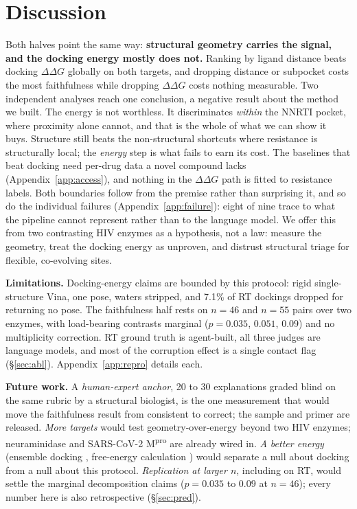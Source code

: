 \documentclass{article}
\newcommand{\ddg}{\ensuremath{\Delta\Delta G}}
\begin{document}
\section{Discussion}
Both halves point the same way: \textbf{structural geometry carries the signal, and the docking energy mostly does not.} Ranking by ligand distance beats docking \ddg{} globally on both targets, and dropping distance or subpocket costs the most faithfulness while dropping \ddg{} costs nothing measurable. Two independent analyses reach one conclusion, a negative result about the method we built. The energy is not worthless. It discriminates \emph{within} the NNRTI pocket, where proximity alone cannot, and that is the whole of what we can show it buys. Structure still beats the non-structural shortcuts where resistance is structurally local; the \emph{energy} step is what fails to earn its cost. The baselines that beat docking need per-drug data a novel compound lacks (Appendix~\ref{app:access}), and nothing in the \ddg{} path is fitted to resistance labels. Both boundaries follow from the premise rather than surprising it, and so do the individual failures (Appendix~\ref{app:failure}): eight of nine trace to what the pipeline cannot represent rather than to the language model. We offer this from two contrasting HIV enzymes as a hypothesis, not a law: measure the geometry, treat the docking energy as unproven, and distrust structural triage for flexible, co-evolving sites.

\textbf{Limitations.} Docking-energy claims are bounded by this protocol: rigid single-structure Vina, one pose, waters stripped, and 7.1\% of RT dockings dropped for returning no pose. The faithfulness half rests on $n=46$ and $n=55$ pairs over two enzymes, with load-bearing contrasts marginal ($p=0.035$, $0.051$, $0.09$) and no multiplicity correction. RT ground truth is agent-built, all three judges are language models, and most of the corruption effect is a single contact flag (\S\ref{sec:abl}). Appendix~\ref{app:repro} details each.

\textbf{Future work.} A \emph{human-expert anchor}, 20 to 30 explanations graded blind on the same rubric by a structural biologist, is the one measurement that would move the faithfulness result from consistent to correct; the sample and primer are released. \emph{More targets} would test geometry-over-energy beyond two HIV enzymes; neuraminidase and SARS-CoV-2 M\textsuperscript{pro} are already wired in. \emph{A better energy} (ensemble docking \citep{amaro2008}, free-energy calculation \citep{hauser2018}) would separate a null about docking from a null about this protocol. \emph{Replication at larger $n$}, including on RT, would settle the marginal decomposition claims ($p=0.035$ to $0.09$ at $n=46$); every number here is also retrospective (\S\ref{sec:pred}).
\end{document}
